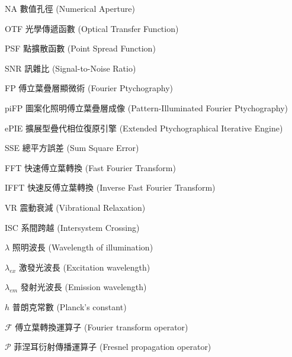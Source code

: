 
\begin{denotation}[3cm]

\item[NA]{
  數值孔徑 (Numerical Aperture)
}

\item[OTF]{
  光學傳遞函數 (Optical Transfer Function)
}

\item[PSF]{
  點擴散函數 (Point Spread Function)
}

\item[SNR]{
  訊雜比 (Signal-to-Noise Ratio)
}

\item[FP]{
  傅立葉疊層顯微術 (Fourier Ptychography)
}

\item[piFP]{
  圖案化照明傅立葉疊層成像 (Pattern-Illuminated Fourier Ptychography)
}

\item[ePIE]{
  擴展型疊代相位復原引擎 (Extended Ptychographical Iterative Engine)
}

\item[SSE]{
  總平方誤差 (Sum Square Error)
}

\item[FFT]{
  快速傅立葉轉換 (Fast Fourier Transform)
}

\item[IFFT]{
  快速反傅立葉轉換 (Inverse Fast Fourier Transform)
}

\item[VR]{
  震動衰減 (Vibrational Relaxation)
}

\item[ISC]{
  系間跨越 (Intersystem Crossing)
}

\item[$\lambda$]{
  照明波長 (Wavelength of illumination)
}

\item[$\lambda_{ex}$]{
  激發光波長 (Excitation wavelength)
}

\item[$\lambda_{em}$]{
  發射光波長 (Emission wavelength)
}

\item[$h$]{
  普朗克常數 (Planck's constant)
}

\item[$\mathcal{F}$]{
  傅立葉轉換運算子 (Fourier transform operator)
}

\item[$\mathcal{P}$]{
  菲涅耳衍射傳播運算子 (Fresnel propagation operator)
}


\end{denotation}
